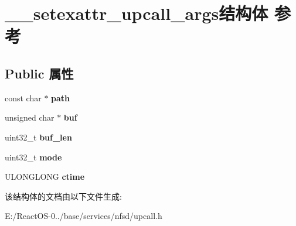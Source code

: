 \hypertarget{struct____setexattr__upcall__args}{}\section{\+\_\+\+\_\+setexattr\+\_\+upcall\+\_\+args结构体 参考}
\label{struct____setexattr__upcall__args}
\subsection*{Public 属性}
\begin{DoxyCompactItemize}
\item 
\mbox{\label{struct____setexattr__upcall__args_ad424c919c824e367ce3a764f65e2e16f}} 
const char $\ast$ {\bfseries path}
\item 
\mbox{\label{struct____setexattr__upcall__args_a04bfbe6618ce4d720996ad140ffb885f}} 
unsigned char $\ast$ {\bfseries buf}
\item 
\mbox{\label{struct____setexattr__upcall__args_a3e7e41e376ffac51ee4b1af6572269fa}} 
uint32\+\_\+t {\bfseries buf\+\_\+len}
\item 
\mbox{\label{struct____setexattr__upcall__args_a9ef47ffd84a743b16f5b7b687fb92c94}} 
uint32\+\_\+t {\bfseries mode}
\item 
\mbox{\label{struct____setexattr__upcall__args_abeed9267395b1e4bb3f1309b5738d3dc}} 
U\+L\+O\+N\+G\+L\+O\+NG {\bfseries ctime}
\end{DoxyCompactItemize}


该结构体的文档由以下文件生成\+:\begin{DoxyCompactItemize}
\item 
E\+:/\+React\+O\+S-\/0../base/services/nfsd/upcall.\+h\end{DoxyCompactItemize}
